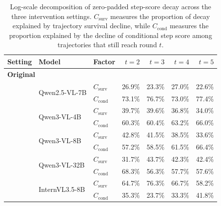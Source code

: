 
\begin{table}[htbp]
\centering
\small
\setlength{\tabcolsep}{4pt}
\renewcommand{\arraystretch}{1.08}
\caption{
Log-scale decomposition of zero-padded step-score decay across the three intervention settings.
\(C_{\mathrm{surv}}\) measures the proportion of decay explained by trajectory survival decline, while
\(C_{\mathrm{cond}}\) measures the proportion explained by the decline of conditional step score among trajectories
that still reach round \(t\).
}
\label{tab:decay_contribution_decomposition}
\begin{tabular}{lllrrrr}
\toprule
\textbf{Setting} & \textbf{Model} & \textbf{Factor} & \textbf{\(t=2\)} & \textbf{\(t=3\)} & \textbf{\(t=4\)} & \textbf{\(t=5\)} \\
\midrule
\multicolumn{7}{l}{\textbf{Original}} \\
\midrule
\multirow{2}{*}{}
& \multirow{2}{*}{Qwen2.5-VL-7B} & \(C_{\mathrm{surv}}\) & 26.9\% & 23.3\% & 27.0\% & 22.6\% \\
&  & \(C_{\mathrm{cond}}\) & 73.1\% & 76.7\% & 73.0\% & 77.4\% \\
\midrule
\multirow{2}{*}{}
& \multirow{2}{*}{Qwen3-VL-4B} & \(C_{\mathrm{surv}}\) & 39.7\% & 39.6\% & 36.8\% & 34.0\% \\
&  & \(C_{\mathrm{cond}}\) & 60.3\% & 60.4\% & 63.2\% & 66.0\% \\
\midrule
\multirow{2}{*}{}
& \multirow{2}{*}{Qwen3-VL-8B} & \(C_{\mathrm{surv}}\) & 42.8\% & 41.5\% & 38.5\% & 33.6\% \\
&  & \(C_{\mathrm{cond}}\) & 57.2\% & 58.5\% & 61.5\% & 66.4\% \\
\midrule
\multirow{2}{*}{}
& \multirow{2}{*}{Qwen3-VL-32B} & \(C_{\mathrm{surv}}\) & 31.7\% & 43.7\% & 42.3\% & 42.4\% \\
&  & \(C_{\mathrm{cond}}\) & 68.3\% & 56.3\% & 57.7\% & 57.6\% \\
\midrule
\multirow{2}{*}{}
& \multirow{2}{*}{InternVL3.5-8B} & \(C_{\mathrm{surv}}\) & 64.7\% & 76.3\% & 66.7\% & 58.2\% \\
&  & \(C_{\mathrm{cond}}\) & 35.3\% & 23.7\% & 33.3\% & 41.8\% \\

\end{tabular}
\end{table}
